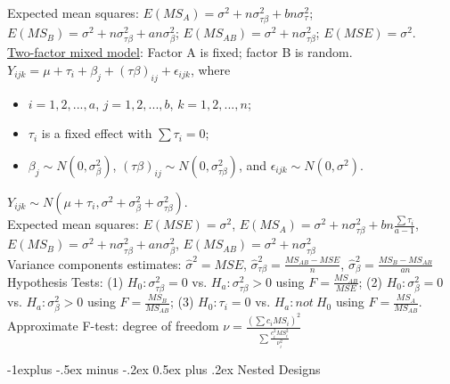 \documentclass[10pt,landscape]{article}
\makeatletter
\renewcommand{\subsection}{\@startsection{subsection}{2}{0mm}%
                                {-1explus -.5ex minus -.2ex}%
                                {0.5ex plus .2ex}%
                                {\normalfont\normalsize\bfseries}}
\makeatother
\begin{document}
\begin{multicols}{3}
\begin{description}
Expected mean squares: $E(MS_A) = \sigma^2 + n\sigma_{\tau \beta}^2 + bn\sigma_{\tau}^2$; $E(MS_B) = \sigma^2 + n\sigma_{\tau \beta}^2 + an\sigma_{\beta}^2$; $E(MS_{AB}) = \sigma^2 + n\sigma_{\tau \beta}^2$; $E(MSE) = \sigma^2$.\\
\underline{Two-factor mixed model}: Factor A is fixed; factor B is random. $Y_{ijk} = \mu + \tau_i + \beta_j + (\tau \beta)_{ij} + \epsilon_{ijk}$, where
\begin{itemize}
	\item $i = 1,2,...,a$, $j = 1,2,...,b$, $k = 1,2,...,n$;
	\item $\tau_i$ is a fixed effect with $\sum \tau_i = 0$;
	\item  $\beta_j \sim N(0, \sigma_\beta ^2)$, $(\tau\beta)_{ij} \sim N(0, \sigma_{\tau\beta}^2)$, and $\epsilon_{ijk} \sim N(0, \sigma^2)$.
\end{itemize}
 $Y_{ijk} \sim N(\mu + \tau_i, \sigma^2 + \sigma_\beta	^2 + \sigma_{\tau\beta}^2)$. \\
Expected mean squares: $E(MSE) = \sigma^2$, $E(MS_A) = \sigma^2 + n\sigma_{\tau\beta}^2 + bn\frac{\sum \tau_i}{a-1}$, $E(MS_B) = \sigma^2 + n\sigma_{\tau\beta}^2 + an\sigma_\beta^2$, $E(MS_{AB}) = \sigma^2 + n\sigma_{\tau\beta}^2$\\
Variance components estimates: $\hat{\sigma}^2 = MSE$, $\hat{\sigma}_{\tau\beta}^2 = \frac{MS_{AB} - MSE}{n}$, $\hat{\sigma}_{\beta}^2 = \frac{MS_{B} - MS_{AB}}{an}$ \\
Hypothesis Tests: (1) $H_0: \sigma_{\tau\beta}^2 = 0$ vs. $H_a: \sigma_{\tau\beta}^2 > 0$ using $F = \frac{MS_{AB}}{MSE}$; (2) $H_0: \sigma_{\beta}^2 = 0$ vs. $H_a: \sigma_{\beta}^2 > 0$ using $F = \frac{MS_{B}}{MS_{AB}}$; (3) $H_0: \tau_i = 0$ vs. $H_a: not\ H_0$ using $F = \frac{MS_{A}}{MS_{AB}}$. \\
Approximate F-test: degree of freedom $\nu = \frac{(\sum c_i MS_i)^2}{\sum \frac{c_i^2 MS_i^2}{\nu_i^2}}$
\end{description}

\subsection{Nested Designs}


\end{multicols}
\end{document}

